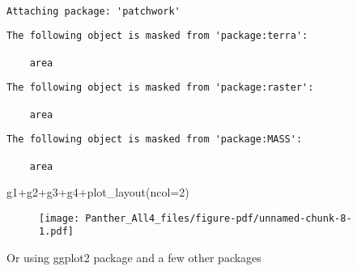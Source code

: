 \documentclass[
  letterpaper,
]{book}
\newenvironment{Shaded}{\begin{snugshade}}{\end{snugshade}}
\newcommand{\AttributeTok}[1]{\textcolor[rgb]{0.40,0.45,0.13}{#1}}
\newcommand{\DecValTok}[1]{\textcolor[rgb]{0.68,0.00,0.00}{#1}}
\newcommand{\FunctionTok}[1]{\textcolor[rgb]{0.28,0.35,0.67}{#1}}
\newcommand{\NormalTok}[1]{\textcolor[rgb]{0.00,0.23,0.31}{#1}}
\newcommand{\SpecialCharTok}[1]{\textcolor[rgb]{0.37,0.37,0.37}{#1}}
\begin{document}
\begin{verbatim}

Attaching package: 'patchwork'
\end{verbatim}

\begin{verbatim}
The following object is masked from 'package:terra':

    area
\end{verbatim}

\begin{verbatim}
The following object is masked from 'package:raster':

    area
\end{verbatim}

\begin{verbatim}
The following object is masked from 'package:MASS':

    area
\end{verbatim}

\begin{Shaded}
\begin{Highlighting}[]
\NormalTok{g1}\SpecialCharTok{+}\NormalTok{g2}\SpecialCharTok{+}\NormalTok{g3}\SpecialCharTok{+}\NormalTok{g4}\SpecialCharTok{+}\FunctionTok{plot\_layout}\NormalTok{(}\AttributeTok{ncol=}\DecValTok{2}\NormalTok{)}
\end{Highlighting}
\end{Shaded}

\begin{figure}[H]

{\centering \texttt{[image: Panther\_All4\_files/figure-pdf/unnamed-chunk-8-1.pdf]}

}

\end{figure}

Or using ggplot2 package and a few other packages
\end{document}
